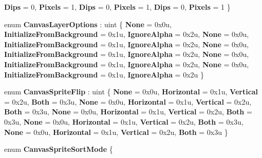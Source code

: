 \begin{DoxyCompactItemize}
{\bfseries Dips} = 0, 
{\bfseries Pixels} = 1, 
{\bfseries Dips} = 0, 
{\bfseries Pixels} = 1, 
\newline
{\bfseries Dips} = 0, 
{\bfseries Pixels} = 1
 \}
\item 
\mbox{\label{namespace_microsoft_1_1_graphics_1_1_canvas_a111054cba4b53759d62af260e252fe48}} 
enum {\bfseries Canvas\+Layer\+Options} \+: uint \{ \newline
{\bfseries None} = 0x0u, 
{\bfseries Initialize\+From\+Background} = 0x1u, 
{\bfseries Ignore\+Alpha} = 0x2u, 
{\bfseries None} = 0x0u, 
\newline
{\bfseries Initialize\+From\+Background} = 0x1u, 
{\bfseries Ignore\+Alpha} = 0x2u, 
{\bfseries None} = 0x0u, 
{\bfseries Initialize\+From\+Background} = 0x1u, 
\newline
{\bfseries Ignore\+Alpha} = 0x2u, 
{\bfseries None} = 0x0u, 
{\bfseries Initialize\+From\+Background} = 0x1u, 
{\bfseries Ignore\+Alpha} = 0x2u, 
\newline
{\bfseries None} = 0x0u, 
{\bfseries Initialize\+From\+Background} = 0x1u, 
{\bfseries Ignore\+Alpha} = 0x2u
 \}
\item 
\mbox{\label{namespace_microsoft_1_1_graphics_1_1_canvas_ab01b519fa39176572bedd129db922814}} 
enum {\bfseries Canvas\+Sprite\+Flip} \+: uint \{ \newline
{\bfseries None} = 0x0u, 
{\bfseries Horizontal} = 0x1u, 
{\bfseries Vertical} = 0x2u, 
{\bfseries Both} = 0x3u, 
\newline
{\bfseries None} = 0x0u, 
{\bfseries Horizontal} = 0x1u, 
{\bfseries Vertical} = 0x2u, 
{\bfseries Both} = 0x3u, 
\newline
{\bfseries None} = 0x0u, 
{\bfseries Horizontal} = 0x1u, 
{\bfseries Vertical} = 0x2u, 
{\bfseries Both} = 0x3u, 
\newline
{\bfseries None} = 0x0u, 
{\bfseries Horizontal} = 0x1u, 
{\bfseries Vertical} = 0x2u, 
{\bfseries Both} = 0x3u, 
\newline
{\bfseries None} = 0x0u, 
{\bfseries Horizontal} = 0x1u, 
{\bfseries Vertical} = 0x2u, 
{\bfseries Both} = 0x3u
 \}
\item 
\mbox{\label{namespace_microsoft_1_1_graphics_1_1_canvas_a78964f5963aadeacf020f306893b03c8}} 
enum {\bfseries Canvas\+Sprite\+Sort\+Mode} \{ \newline

\end{DoxyCompactItemize}
